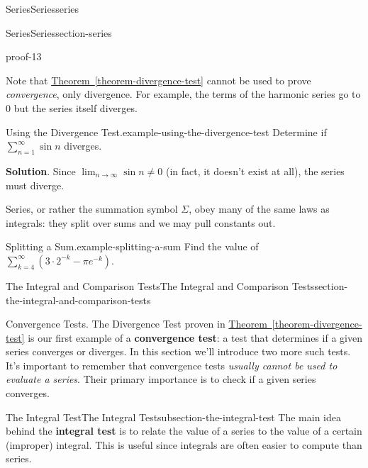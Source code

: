 \documentclass[oneside,10pt,]{book}
\newcommand{\terminology}[1]{\textbf{#1}}
\numberwithin{equation}{section}
\begin{document}
\begin{chapterptx}{Series}{}{Series}{}{}{series}
\begin{sectionptx}{Series}{}{Series}{}{}{section-series}
\begin{proofptx}{}{proof-13}
\end{proofptx}
\hypertarget{p-866}{}%
Note that \hyperref[theorem-divergence-test]{Theorem~\ref{theorem-divergence-test}} cannot be used to prove \emph{convergence}, only divergence. For example, the terms of the harmonic series go to \(0\) but the series itself diverges.%
\begin{example}{Using the Divergence Test.}{example-using-the-divergence-test}%
\hypertarget{p-867}{}%
Determine if \(\sum_{n=1}^{\infty}\sin n\) diverges.%
\par\smallskip%
\noindent\textbf{Solution}.\hypertarget{solution-180}{}\quad%
\hypertarget{p-868}{}%
Since \(\lim_{n\to\infty}\sin n\neq 0\) (in fact, it doesn't exist at all), the series must diverge.%
\end{example}
\hypertarget{p-869}{}%
Series, or rather the summation symbol \(\Sigma\), obey many of the same laws as integrals: they split over sums and we may pull constants out.%
\begin{example}{Splitting a Sum.}{example-splitting-a-sum}%
\hypertarget{p-870}{}%
Find the value of \(\sum_{k=4}^{\infty}\left(3\cdot2^{-k} - \pi e^{-k}\right)\).%
\end{example}
\end{sectionptx}
%
%
\typeout{************************************************}
\typeout{************************************************}
%
\begin{sectionptx}{The Integral and Comparison Tests}{}{The Integral and Comparison Tests}{}{}{section-the-integral-and-comparison-tests}
\begin{introduction}{Convergence Tests.}%
\hypertarget{p-871}{}%
The Divergence Test proven in \hyperref[theorem-divergence-test]{Theorem~\ref{theorem-divergence-test}} is our first example of a \terminology{convergence test}: a test that determines if a given series converges or diverges. In this section we'll introduce two more such tests. It's important to remember that convergence tests \emph{usually cannot be used to evaluate a series}. Their primary importance is to check if a given series converges.%
\end{introduction}%
%
%
\typeout{************************************************}
\typeout{************************************************}
%
\begin{subsectionptx}{The Integral Test}{}{The Integral Test}{}{}{subsection-the-integral-test}
\hypertarget{p-872}{}%
The main idea behind the \terminology{integral test} is to relate the value of a series to the value of a certain (improper) integral. This is useful since integrals are often easier to compute than series.%

\end{subsectionptx}
\end{sectionptx}
\end{chapterptx}
\end{document}
